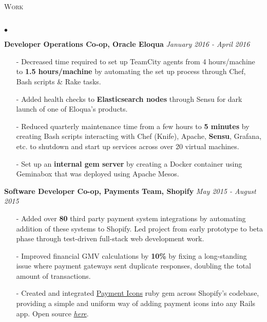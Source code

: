 \documentclass[11pt]{article}
\newcommand{\lineunder}{\vspace*{-8pt} \\ \hspace*{-18pt} \hrulefill \\}
\newcommand{\header}[1]{{\hspace*{-15pt}\vspace*{6pt} \textsc{#1}} \vspace*{-6pt} \lineunder }
\newenvironment{achievements}{\begin{list}{$\bullet$}{\topsep 0pt \itemsep -1.5pt \leftmargin 5pt}}{\vspace*{4pt}\end{list}}
\begin{document}
\header{\fontsize{11.1}{10}\selectfont Work}
\begin{achievements}
\item \textbf{{\fontsize{9.5}{10}\selectfont  Developer Operations Co-op, Oracle Eloqua}} \hfill \textit {January 2016 - April 2016}
\begin{itemize}
\item[-]Decreased time required to set up TeamCity agents from 4 hours/machine to \textbf{1.5 hours/machine} by automating the set up process through Chef, Bash scripts \& Rake tasks.
\vspace{2pt}
\item[-]Added health checks to \textbf{Elasticsearch nodes} through Sensu for dark launch of one of Eloqua's products.
\vspace{2pt}
\item[-]Reduced quarterly maintenance time from a few hours to \textbf{5 minutes} by creating Bash scripts interacting with Chef (Knife), Apache, \textbf{Sensu}, Grafana, etc. to shutdown and start up services across over 20 virtual machines.
\vspace{2pt}
\item[-]Set up an \textbf{internal gem server} by creating a Docker container using Geminabox that was deployed using Apache Mesos.
\end{itemize}
\vspace{4pt}
\item \textbf{{\fontsize{9.5}{10}\selectfont Software Developer Co-op, Payments Team, Shopify}} \hfill \textit {May 2015 - August 2015}
\begin{itemize}
\item[-]Added over \textbf{80} third party payment system integrations by automating addition of these systems to Shopify. Led project from early prototype to beta phase through test-driven full-stack web development work.
\vspace{2pt}
\item[-]Improved financial GMV calculations by \textbf{10\%} by fixing a long-standing issue where payment gateways sent duplicate responses, doubling the total amount of transactions. 
\vspace{2pt}
\item[-]Created and integrated \href{https://github.com/activemerchant/payment_icons}{Payment Icons} ruby gem across Shopify's codebase, providing a simple and uniform way of adding payment icons into any Rails app. Open source \href{https://github.com/activemerchant/payment_icons}{\textit{here}}.
\end{itemize}
\end{achievements}
\end{document}
